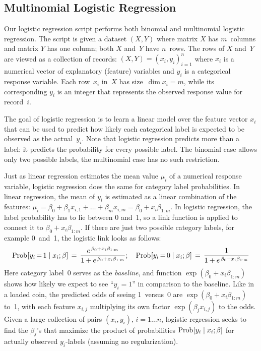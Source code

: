 \subsection{Multinomial Logistic Regression}

\smallskip

Our logistic regression script performs both binomial and multinomial logistic regression.
The script is given a dataset $(X, Y)$ where matrix $X$ has $m$~columns and matrix $Y$ has
one column; both $X$ and~$Y$ have $n$~rows.  The rows of $X$ and~$Y$ are viewed as a collection
of records: $(X, Y) = (x_i, y_i)_{i=1}^n$ where $x_i$ is a numerical vector of explanatory
(feature) variables and $y_i$ is a categorical response variable.
Each row~$x_i$ in~$X$ has size~\mbox{$\dim x_i = m$}, while its corresponding $y_i$ is an
integer that represents the observed response value for record~$i$.

The goal of logistic regression is to learn a linear model over the feature vector
$x_i$ that can be used to predict how likely each categorical label is expected to
be observed as the actual~$y_i$.
Note that logistic regression predicts more than a label: it predicts the probability
for every possible label.  The binomial case allows only two possible labels, the
multinomial case has no such restriction.

Just as linear regression estimates the mean value $\mu_i$ of a numerical response
variable, logistic regression does the same for category label probabilities.
In linear regression, the mean of $y_i$ is estimated as a linear combination of the features:
$\mu_i = \beta_0 + \beta_1 x_{i,1} + \ldots + \beta_m x_{i,m} = \beta_0 + x_i\beta_{1:m}$.
In logistic regression, the
label probability has to lie between 0 and~1, so a link function is applied to connect
it to $\beta_0 + x_i\beta_{1:m}$.  If there are just two possible category labels, for example
0~and~1, the logistic link looks as follows:
\begin{equation*}
\mathop{\mathrm{Prob}\hspace{0.5pt}}\nolimits[y_i\,{=}\,1\mid x_i; \beta] \,=\, 
\frac{e^{\,\beta_0 + x_i\beta_{1:m}}}{1 + e^{\,\beta_0 + x_i\beta_{1:m}}};
\quad
\mathop{\mathrm{Prob}\hspace{0.5pt}}\nolimits[y_i\,{=}\,0\mid x_i; \beta] \,=\, 
\frac{1}{1 + e^{\,\beta_0 + x_i\beta_{1:m}}}
\end{equation*}
Here category label~0 serves as the \emph{baseline}, and function
$\exp(\beta_0 + x_i\beta_{1:m})$
shows how likely we expect to see ``$y_i = 1$'' in comparison to the baseline.
Like in a loaded coin, the predicted odds of seeing 1~versus~0 are
$\exp(\beta_0 + x_i\beta_{1:m})$ to~1,
with each feature $x_{i,j}$ multiplying its own factor $\exp(\beta_j x_{i,j})$ to the odds.
Given a large collection of pairs $(x_i, y_i)$, $i=1\ldots n$, logistic regression seeks
to find the $\beta_j$'s that maximize the product of probabilities
\hbox{$\mathop{\mathrm{Prob}\hspace{0.5pt}}\nolimits[y_i\mid x_i; \beta]$}
for actually observed $y_i$-labels (assuming no regularization).

